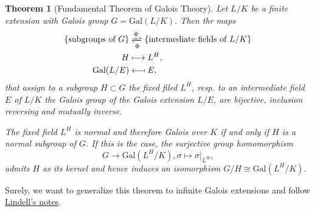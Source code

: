 \documentclass[12pt]{report}
\newtheorem{theorem}{Theorem}[section]
\theoremstyle{definition}
\newcommand{\gal}{\text{Gal}}
\begin{document}
\begin{theorem}[Fundamental Theorem of Galois Theory]
	Let $L/K$ be a finite extension with Galois group $G=\gal(L/K)$. Then thr maps
	\begin{align*}
		\{\mbox{subgroups of } G\} & \xrightleftharpoons[\Phi]{\Psi} \{\mbox{intermediate fields of } L/K\} \\
		H                          & \longmapsto L^H,                                                       \\
		\gal(L/E)                  & \longmapsfrom E,
	\end{align*}
	that assign to a subgroup $H\subset G$ the fixed filed $L^H$, resp. to an intermediate field $E$ of $L/K$ the Galois group of the Galois extension $L/E$, are bijective, inclusion reversing and mutually inverse.


	The fixed field $L^H$ is normal and therefore Galois over $K$ if and only if $H$ is a normal subgroup of $G$. If this is the case, the surjective group homomorphism
	\[G\to \gal(L^H/K), \sigma\mapsto \sigma|_{L^H},\]
	admits $H$ as its kernel and hence induces an isomorphism $G/H\cong \gal(L^H/K)$.
\end{theorem}

Surely, we want to generalize this theorem to infinite Galois extensions and follow \hyperlink{http://uu.diva-portal.org/smash/get/diva2:1374695/FULLTEXT01.pdf}{Lindell's notes}.





\end{document}
